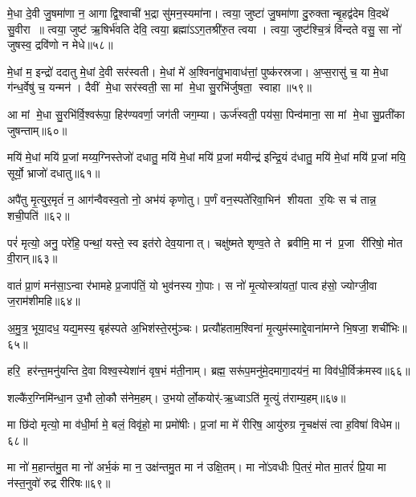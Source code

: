 मे॒धा दे॒वी जु॒षमा॑णा न॒ आगाद्वि॒श्वाची॑ भ॒द्रा सु॑मन॒स्यमा॑ना। 
त्वया॒ जुष्टा॑ जु॒षमा॑णा दु॒रुक्तान्बृ॒हद्व॑देम वि॒दथे॑ सु॒वीरा॥ 
त्वया॒ जुष्ट॑ ऋ॒षिर्भ॑वति देवि॒ त्वया॒ ब्रह्मा॑ऽऽग॒तश्री॑रु॒त त्वया। 
त्वया॒ जुष्ट॑श्चि॒त्रं वि॑न्दते वसु॒ सा नो॑ जुषस्व॒ द्रवि॑णो न मेधे॥५८॥
\anuvakamend


मे॒धां म॒ इन्द्रो॑ ददातु मे॒धां दे॒वी सर॑स्वती। 
मे॒धां मे॑ अ॒श्विना॑वु॒भावाध॑त्तां॒ पुष्क॑रस्रजा। 
अ॒प्स॒रासु॑ च॒ या मे॒धा ग॑न्ध॒र्वेषु॑ च॒ यन्मन॑। 
दैवीं मे॒धा सर॑स्वती॒ सा मां मे॒धा सु॒रभि॑र्जुषता॒ स्वाहा॥५९॥
\anuvakamend


आ मां मे॒धा सु॒रभि॑र्वि॒श्वरू॑पा॒ हिर॑ण्यवर्णा॒ जग॑ती जग॒म्या। 
ऊर्ज॑स्वती॒ पय॑सा॒ पिन्व॑माना॒ सा मां मे॒धा सु॒प्रती॑का जुषन्ताम्॥६०॥ 
\anuvakamend

मयि॑ मे॒धां मयि॑ प्र॒जां मय्य॒ग्निस्तेजो॑ दधातु॒ मयि॑ मे॒धां मयि॑ प्र॒जां मयीन्द्र॑ इन्द्रि॒यं द॑धातु॒ मयि॑ मे॒धां मयि॑ प्र॒जां मयि॒ सूर्यो॒ भ्राजो॑ दधातु॥६१॥ 
\anuvakamend


अपै॑तु मृ॒त्युर॒मृतं॑ न॒ आग॑न्वैवस्व॒तो नो॒ अभ॑यं कृणोतु। 
प॒र्णं वन॒स्पते॑रिवा॒भिन॑ शीयता र॒यिः स च॑ तान्न॒ शची॒पति॑॥६२॥%
\anuvakamend

 परं॑ मृत्यो॒ अनु॒ परे॑हि॒ पन्थां॒ यस्ते॒ स्व इत॑रो देव॒यानात्। 
 चक्षु॑ष्मते शृण्व॒ते ते ब्रवीमि॒ मा न॑ प्र॒जा री॑रिषो॒ मोत वी॒रान्॥६३॥
 \anuvakamend
 
 वातं॑ प्रा॒णं मन॑सा॒ऽन्वा र॑भामहे प्र॒जाप॑तिं॒ यो भुव॑नस्य गो॒पाः। 
 स नो॑ मृ॒त्योस्त्रा॑यतां॒ पात्वह॑सो॒ ज्योग्जी॒वा ज॒राम॑शीमहि॥६४॥
 \anuvakamend
 
 अ॒मु॒त्र॒ भूया॒दध॒ यद्य॒मस्य॒ बृह॑स्पते अ॒भिश॑स्ते॒रमु॑ञ्चः। 
 प्रत्यौ॑हताम॒श्विना॑ मृ॒त्युम॑स्माद्दे॒वाना॑मग्ने भि॒षजा॒ शची॑भिः॥६५॥
 \anuvakamend
 
 हरि॒ हर॑न्त॒मनु॑यन्ति दे॒वा विश्व॒स्येशा॑नं वृष॒भं म॑ती॒नाम्। 
 ब्रह्म॒ सरू॑प॒मनु॑मे॒दमागा॒दय॑नं॒ मा विव॑धी॒र्विक्र॑मस्व॥६६॥
 \anuvakamend
 
 शल्कै॑र॒ग्निमि॑न्धा॒न उ॒भौ लो॒कौ स॑नेम॒हम्। 
 उ॒भयोर्लो॒कयोर्॑-ऋ॒ध्वाऽति॑ मृ॒त्युं त॑राम्य॒हम्॥६७॥
\anuvakamend
 
मा छि॑दो मृत्यो॒ मा व॑धी॒र्मा मे॒ बलं॒ विवृ॑हो॒ मा प्रमो॑षीः। 
प्र॒जां मा मे॑ रीरिष॒ आयु॑रुग्र नृ॒चक्ष॑सं त्वा ह॒विषा॑ विधेम॥६८॥
\anuvakamend
 
मा नो॑ म॒हान्त॑मु॒त मा नो॑ अर्भ॒कं मा न॒ उक्ष॑न्तमु॒त मा न॑ उक्षि॒तम्। 
मा नो॑ऽवधीः पि॒तरं॒ मोत मा॒तरं॑ प्रि॒या मा न॑स्त॒नुवो॑ रुद्र रीरिषः॥६९॥
\anuvakamend

